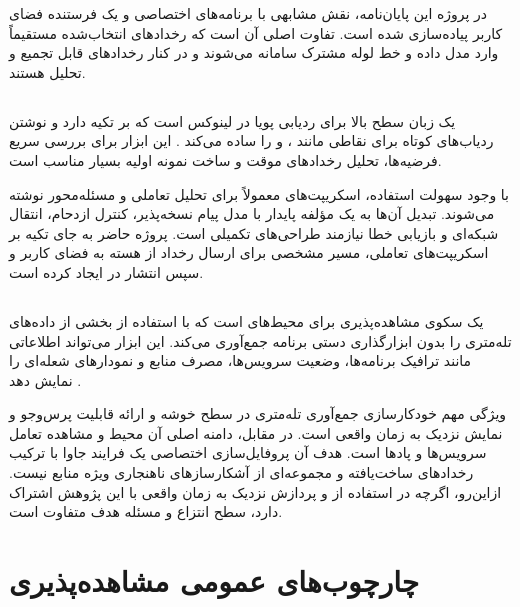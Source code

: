 در پروژه این پایان‌نامه، نقش مشابهی با برنامه‌های اختصاصی  و
یک فرستنده فضای کاربر پیاده‌سازی شده است. تفاوت اصلی آن است که رخدادهای
انتخاب‌شده مستقیماً وارد مدل داده و خط لوله مشترک سامانه می‌شوند و در
کنار رخدادهای  قابل تجمیع و تحلیل هستند.

\subsection{}

 یک زبان سطح بالا برای ردیابی پویا در لینوکس است که بر
 تکیه دارد و نوشتن ردیاب‌های کوتاه برای نقاطی مانند
،  و  را ساده می‌کند
\cite{bpftracedocs}. این ابزار برای بررسی سریع فرضیه‌ها، تحلیل رخدادهای
موقت و ساخت نمونه اولیه بسیار مناسب است.

با وجود سهولت استفاده، اسکریپت‌های  معمولاً برای تحلیل
تعاملی و مسئله‌محور نوشته می‌شوند. تبدیل آن‌ها به یک مؤلفه پایدار با مدل
پیام نسخه‌پذیر، کنترل ازدحام، انتقال شبکه‌ای و بازیابی خطا نیازمند
طراحی‌های تکمیلی است. پروژه حاضر به جای تکیه بر اسکریپت‌های تعاملی، مسیر
مشخصی برای ارسال رخداد از هسته به فضای کاربر و سپس انتشار در
 ایجاد کرده است.

\subsection{}

 یک سکوی مشاهده‌پذیری برای محیط‌های  است که با
استفاده از  بخشی از داده‌های تله‌متری را بدون ابزارگذاری دستی
برنامه جمع‌آوری می‌کند. این ابزار می‌تواند اطلاعاتی مانند ترافیک
برنامه‌ها، وضعیت سرویس‌ها، مصرف منابع و نمودارهای شعله‌ای را نمایش دهد
\cite{pixiedocs,pixiearchitecture}.

ویژگی مهم  خودکارسازی جمع‌آوری تله‌متری در سطح خوشه و ارائه
قابلیت پرس‌وجو و نمایش نزدیک به زمان واقعی است. در مقابل، دامنه اصلی آن
محیط  و مشاهده تعامل سرویس‌ها و پادها است. هدف آن
پروفایل‌سازی اختصاصی یک فرایند جاوا با ترکیب رخدادهای ساخت‌یافته
 و مجموعه‌ای از آشکارسازهای ناهنجاری ویژه منابع نیست. ازاین‌رو،
اگرچه در استفاده از  و پردازش نزدیک به زمان واقعی با این پژوهش
اشتراک دارد، سطح انتزاع و مسئله هدف متفاوت است.

\section{چارچوب‌های عمومی مشاهده‌پذیری}
\label{sec:related-observability-frameworks}

